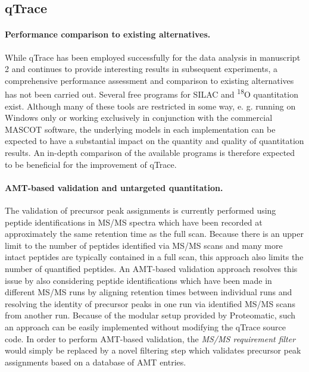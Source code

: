 
\subsection{qTrace}

\paragraph{Performance comparison to existing alternatives.}

While qTrace has been employed successfully for the data analysis in 
manuscript 2 and continues to provide interesting results in subsequent 
experiments, a comprehensive performance assessment and comparison to existing 
alternatives has not been carried out.
Several free programs for SILAC \citep{Kohlbacher2007, Cox2008, Mortensen2010} 
and \textsuperscript{18}O quantitation \citep{Halligan2005, Shinkawa2005} exist.
Although many of these tools are restricted in some way, e. g. running on
Windows only or working exclusively in conjunction with the commercial MASCOT
software, the underlying models in each implementation can be expected to
have a substantial impact on the quantity and quality of quantitation results.
An in-depth comparison of the available programs is therefore expected to
be beneficial for the improvement of qTrace.

\paragraph{AMT-based validation and untargeted quantitation.}

The validation of precursor peak assignments is currently performed using
peptide identifications in MS/MS spectra which have been recorded at 
approximately the same retention time as the full scan.
Because there is an upper limit to the number of peptides identified via MS/MS
scans and many more intact peptides are typically contained in a full scan,
this approach also limits the number of quantified peptides.
An AMT-based validation approach \citep{Mueller2007} resolves this issue by
also considering peptide identifications which have been made in different
MS/MS runs by aligning retention times between individual runs and 
resolving the identity of precursor peaks in one run via identified MS/MS scans
from another run.
Because of the modular setup provided by Proteomatic, such an approach can
be easily implemented without modifying the qTrace source code.
In order to perform AMT-based validation, the {\em MS/MS requirement filter}
would simply be replaced by a novel filtering step which validates precursor
peak assignments based on a database of AMT entries.

